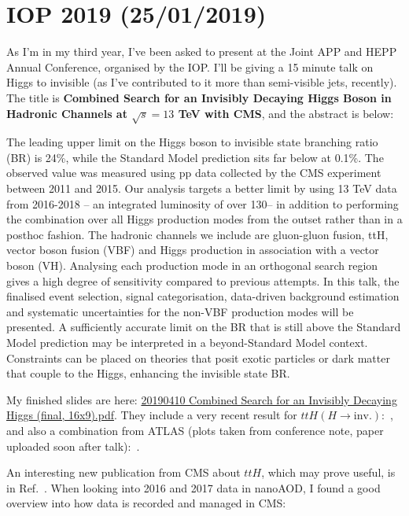 \section{IOP 2019 (25/01/2019)}

As I'm in my third year, I've been asked to present at the Joint APP and HEPP Annual Conference, organised by the IOP. I'll be giving a 15 minute talk on Higgs to invisible (as I've contributed to it more than semi-visible jets, recently). The title is \textbf{Combined Search for an Invisibly Decaying Higgs Boson in Hadronic Channels at $\sqrt{s} = 13$ TeV with CMS}, and the abstract is below:

The leading upper limit on the Higgs boson to invisible state branching ratio (BR) is 24\%, while the Standard Model prediction sits far below at 0.1\%. The observed value was measured using pp data collected by the CMS experiment between 2011 and 2015. Our analysis targets a better limit by using 13 TeV data from 2016-2018 -- an integrated luminosity of over 130\fbinv -- in addition to performing the combination over all Higgs production modes from the outset rather than in a posthoc fashion. The hadronic channels we include are gluon-gluon fusion, ttH, vector boson fusion (VBF) and Higgs production in association with a vector boson (VH). Analysing each production mode in an orthogonal search region gives a high degree of sensitivity compared to previous attempts. In this talk, the finalised event selection, signal categorisation, data-driven background estimation and systematic uncertainties for the non-VBF production modes will be presented. A sufficiently accurate limit on the BR that is still above the Standard Model prediction may be interpreted in a beyond-Standard Model context. Constraints can be placed on theories that posit exotic particles or dark matter that couple to the Higgs, enhancing the invisible state BR.

My finished slides are here: \href{run:./sec37/20190410 Combined Search for an Invisibly Decaying Higgs (final, 16x9).pdf}{20190410 Combined Search for an Invisibly Decaying Higgs (final, 16x9).pdf}. They include a very recent result for $ttH (H \rightarrow \mathrm{inv.})$:~\cite{CMS-PAS-HIG-18-008}, and also a combination from ATLAS (plots taken from conference note, paper uploaded soon after talk):~\cite{Aaboud:2019rtt}.


An interesting new publication from CMS about $ttH$, which may prove useful, is in Ref.~\cite{PhysRevLett.120.231801}.
When looking into 2016 and 2017 data in nanoAOD, I found a good overview into how data is recorded and managed in CMS: %
